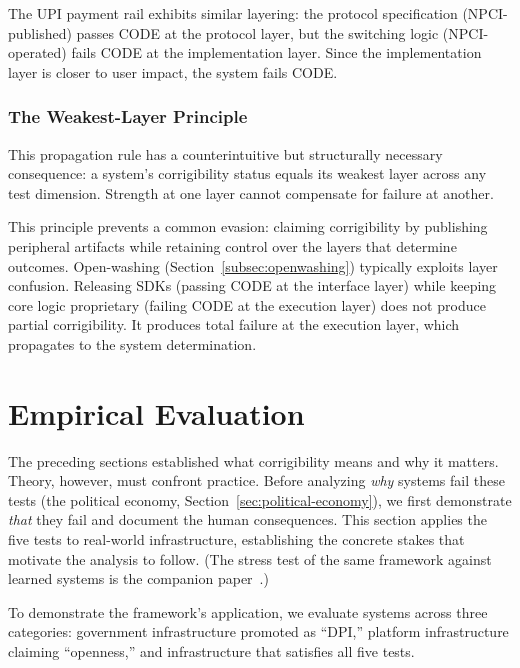 \documentclass{article}
\begin{document}
The UPI payment rail exhibits similar layering: the protocol specification (NPCI-published) passes CODE at the protocol layer, but the switching logic (NPCI-operated) fails CODE at the implementation layer. Since the implementation layer is closer to user impact, the system fails CODE.

\subsubsection{The Weakest-Layer Principle}

This propagation rule has a counterintuitive but structurally necessary consequence: a system's corrigibility status equals its weakest layer across any test dimension. Strength at one layer cannot compensate for failure at another.

This principle prevents a common evasion: claiming corrigibility by publishing peripheral artifacts while retaining control over the layers that determine outcomes. Open-washing (Section~\ref{subsec:openwashing}) typically exploits layer confusion. Releasing SDKs (passing CODE at the interface layer) while keeping core logic proprietary (failing CODE at the execution layer) does not produce partial corrigibility. It produces total failure at the execution layer, which propagates to the system determination.


\section{Empirical Evaluation}
\label{sec:diagnosis}

The preceding sections established what corrigibility means and why it matters. Theory, however, must confront practice. Before analyzing \textit{why} systems fail these tests (the political economy, Section~\ref{sec:political-economy}), we first demonstrate \textit{that} they fail and document the human consequences. This section applies the five tests to real-world infrastructure, establishing the concrete stakes that motivate the analysis to follow. (The stress test of the same framework against learned systems is the companion paper~\citep{aravind2026epi}.)

To demonstrate the framework's application, we evaluate systems across three categories: government infrastructure promoted as ``DPI,'' platform infrastructure claiming ``openness,'' and infrastructure that satisfies all five tests.
\end{document}
